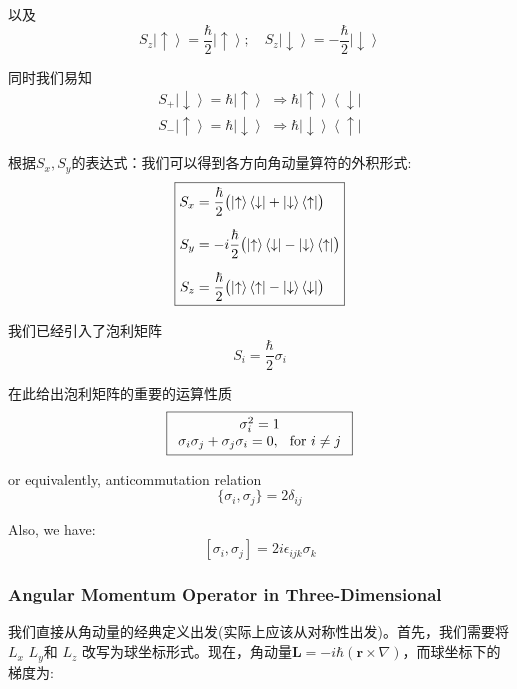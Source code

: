 以及
\[{S_z}\left|  \uparrow  \right\rangle  = \frac{\hbar }{2}\left|  \uparrow  \right\rangle ;\quad {S_z}\left|  \downarrow  \right\rangle = -\frac{\hbar }{2}\left|  \downarrow  \right\rangle\]

同时我们易知
\[\begin{gathered}
	{S_ + }\left|  \downarrow  \right\rangle  = \hbar \left|  \uparrow  \right\rangle \,\, \Rightarrow \hbar \left|  \uparrow  \right\rangle \left\langle  \downarrow  \right|\\
	{S_ - }\left|  \uparrow  \right\rangle  = \hbar \left|  \downarrow  \right\rangle \,\, \Rightarrow \hbar \left|  \downarrow  \right\rangle \left\langle  \uparrow  \right|
\end{gathered}\]

根据\({S_x},{S_y}\)的表达式：我们可以得到各方向角动量算符的外积形式:
\[
\boxed{
	\begin{aligned}
		S_x &= \frac{\hbar}{2} \bigl( \ket{\uparrow}\bra{\downarrow} + \ket{\downarrow}\bra{\uparrow} \bigr) \\[6pt]
		S_y &= -i\frac{\hbar}{2} \bigl( \ket{\uparrow}\bra{\downarrow} - \ket{\downarrow}\bra{\uparrow} \bigr) \\[6pt]
		S_z &= \frac{\hbar}{2} \bigl( \ket{\uparrow}\bra{\uparrow} - \ket{\downarrow}\bra{\downarrow} \bigr)
	\end{aligned}
}
\]

我们已经引入了泡利矩阵
\[
{S_i} = \frac{\hbar }{2}{\sigma _i}
\]

在此给出泡利矩阵的重要的运算性质
\[\boxed{
	\begin{array}{c}
		\sigma _i^2 = 1\\
		{\sigma _i}{\sigma _j} + {\sigma _j}{\sigma _i} = 0,\;\;{\mkern 1mu} {\kern 1pt} {\rm{for }}\,\, i \ne j
	\end{array}
}\]

or equivalently, anticommutation relation
\[
\boxed{
	\{ \sigma_i, \sigma_j \} = 2\delta_{ij}
}
\]

Also, we have:
\[
\boxed{
	[ \sigma_i, \sigma_j ] = 2i \epsilon_{ijk} \sigma_k
}
\]

\subsubsection{Angular Momentum Operator in Three-Dimensional}
我们直接从角动量的经典定义出发(实际上应该从对称性出发)。首先，我们需要将$L_x$ $L_y$和 $L_z$ 改写为球坐标形式。现在，角动量$\mathbf{L} = -i\hbar (\mathbf{r} \times \nabla)$，而球坐标下的梯度为:

